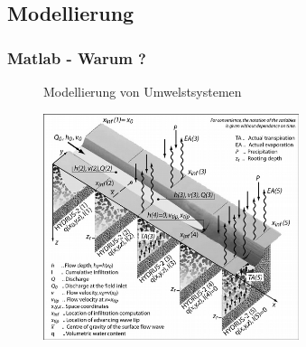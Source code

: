     \subsection{Modellierung}
    \begin{frame}
      \frametitle{Matlab - Warum ?}
      \vspace{-0.8cm}
      \begin{figure}
        Modellierung von Umwelstsystemen \par \vspace{0.4cm}
        \includegraphics[width=7.5cm]{modellierung1.png}
      \end{figure}
    \end{frame}

